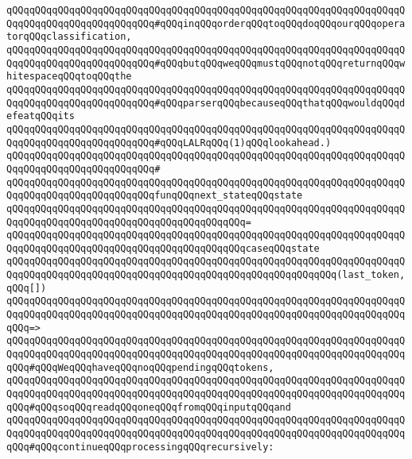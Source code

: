 \verb|qQQqqQQqqQQqqQQqqQQqqQQqqQQqqQQqqQQqqQQqqQQqqQQqqQQqqQQqqQQqqQQqqQQqqQQqqQQqqQQqqQQqqQQqqQQqqQQq#qQQqinqQQqorderqQQqtoqQQqdoqQQqourqQQqoperatorqQQqclassification,|\newline
\verb|qQQqqQQqqQQqqQQqqQQqqQQqqQQqqQQqqQQqqQQqqQQqqQQqqQQqqQQqqQQqqQQqqQQqqQQqqQQqqQQqqQQqqQQqqQQqqQQq#qQQqbutqQQqweqQQqmustqQQqnotqQQqreturnqQQqwhitespaceqQQqtoqQQqthe|\newline
\verb|qQQqqQQqqQQqqQQqqQQqqQQqqQQqqQQqqQQqqQQqqQQqqQQqqQQqqQQqqQQqqQQqqQQqqQQqqQQqqQQqqQQqqQQqqQQqqQQq#qQQqparserqQQqbecauseqQQqthatqQQqwouldqQQqdefeatqQQqits|\newline
\verb|qQQqqQQqqQQqqQQqqQQqqQQqqQQqqQQqqQQqqQQqqQQqqQQqqQQqqQQqqQQqqQQqqQQqqQQqqQQqqQQqqQQqqQQqqQQqqQQq#qQQqLALRqQQq(1)qQQqlookahead.)|\newline
\verb|qQQqqQQqqQQqqQQqqQQqqQQqqQQqqQQqqQQqqQQqqQQqqQQqqQQqqQQqqQQqqQQqqQQqqQQqqQQqqQQqqQQqqQQqqQQqqQQq#|\newline
\verb|qQQqqQQqqQQqqQQqqQQqqQQqqQQqqQQqqQQqqQQqqQQqqQQqqQQqqQQqqQQqqQQqqQQqqQQqqQQqqQQqqQQqqQQqqQQqqQQqfunqQQqnext_stateqQQqstate|\newline
\verb|qQQqqQQqqQQqqQQqqQQqqQQqqQQqqQQqqQQqqQQqqQQqqQQqqQQqqQQqqQQqqQQqqQQqqQQqqQQqqQQqqQQqqQQqqQQqqQQqqQQqqQQqqQQqqQQq=|\newline
\verb|qQQqqQQqqQQqqQQqqQQqqQQqqQQqqQQqqQQqqQQqqQQqqQQqqQQqqQQqqQQqqQQqqQQqqQQqqQQqqQQqqQQqqQQqqQQqqQQqqQQqqQQqqQQqqQQqcaseqQQqstate|\newline
\newline
\verb|qQQqqQQqqQQqqQQqqQQqqQQqqQQqqQQqqQQqqQQqqQQqqQQqqQQqqQQqqQQqqQQqqQQqqQQqqQQqqQQqqQQqqQQqqQQqqQQqqQQqqQQqqQQqqQQqqQQqqQQqqQQqqQQq(last_token,qQQq[])|\newline
\verb|qQQqqQQqqQQqqQQqqQQqqQQqqQQqqQQqqQQqqQQqqQQqqQQqqQQqqQQqqQQqqQQqqQQqqQQqqQQqqQQqqQQqqQQqqQQqqQQqqQQqqQQqqQQqqQQqqQQqqQQqqQQqqQQqqQQqqQQqqQQqqQQq=>|\newline
\verb|qQQqqQQqqQQqqQQqqQQqqQQqqQQqqQQqqQQqqQQqqQQqqQQqqQQqqQQqqQQqqQQqqQQqqQQqqQQqqQQqqQQqqQQqqQQqqQQqqQQqqQQqqQQqqQQqqQQqqQQqqQQqqQQqqQQqqQQqqQQqqQQq#qQQqWeqQQqhaveqQQqnoqQQqpendingqQQqtokens,|\newline
\verb|qQQqqQQqqQQqqQQqqQQqqQQqqQQqqQQqqQQqqQQqqQQqqQQqqQQqqQQqqQQqqQQqqQQqqQQqqQQqqQQqqQQqqQQqqQQqqQQqqQQqqQQqqQQqqQQqqQQqqQQqqQQqqQQqqQQqqQQqqQQqqQQq#qQQqsoqQQqreadqQQqoneqQQqfromqQQqinputqQQqand|\newline
\verb|qQQqqQQqqQQqqQQqqQQqqQQqqQQqqQQqqQQqqQQqqQQqqQQqqQQqqQQqqQQqqQQqqQQqqQQqqQQqqQQqqQQqqQQqqQQqqQQqqQQqqQQqqQQqqQQqqQQqqQQqqQQqqQQqqQQqqQQqqQQqqQQq#qQQqcontinueqQQqprocessingqQQqrecursively:|\newline
